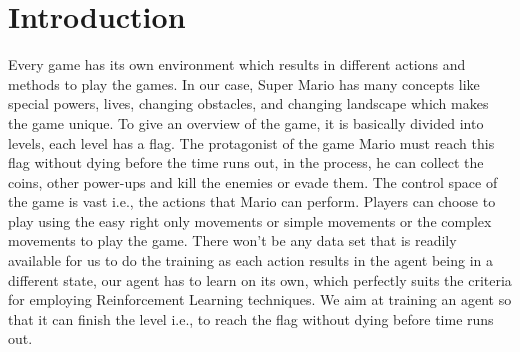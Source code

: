 \documentclass[conference]{IEEEtran}
\theoremstyle{definition}
\begin{document}
\section{Introduction}
Every game has its own environment which results in different actions and methods to play the games. In our case, Super Mario has many concepts like special powers, lives, changing obstacles, and changing landscape which makes the game unique. To give an overview of the game, it is basically divided into levels, each level has a flag. The protagonist of the game Mario must reach this flag without dying before the time runs out, in the process, he can collect the coins, other power-ups and kill the enemies or evade them. The control space of the game is vast i.e., the actions that Mario can perform. Players can choose to play using the easy right only movements or simple movements or the complex movements to play the game. There won't be any data set that is readily available for us to do the training as each action results in the agent being in a different state, our agent has to learn on its own, which perfectly suits the criteria for employing Reinforcement Learning techniques. We aim at training an agent so that it can finish the level i.e., to reach the flag without dying before time runs out.
\end{document}
